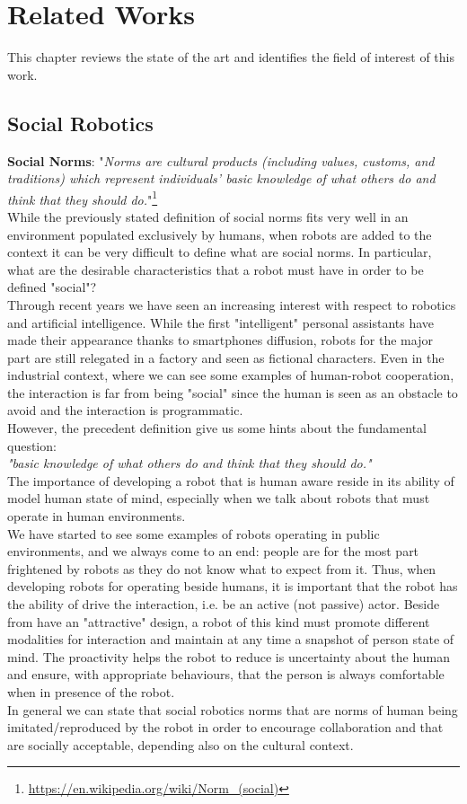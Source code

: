 \documentclass[pdftex,12pt,a4paper]{report}
\begin{document}
\chapter{Related Works}\label{sec:related_works}
This chapter reviews the state of the art and identifies the field of interest of this work.

\section{Social Robotics}
\textbf{Social Norms}: "\textit{Norms are cultural products (including values, customs, and traditions) which represent individuals' basic knowledge of what others do and think that they should do.}"\footnote{\url{https://en.wikipedia.org/wiki/Norm_(social)}}\\
\newline
\noindent While the previously stated definition of social norms fits very well in an environment populated exclusively by humans, when robots are added to the context it can be very difficult to define what are social norms. In particular, what are the desirable characteristics that a robot must have in order to be defined "social"?\\
\noindent Through recent years we have seen an increasing interest with respect to robotics and artificial intelligence. %
While the first "intelligent" personal assistants have made their appearance thanks to smartphones diffusion, robots for the major part are still relegated in a factory and seen as fictional characters.
Even in the industrial context, where we can see some examples of human-robot cooperation, the interaction is far from being "social" since the human is seen as an obstacle to avoid and the interaction is programmatic.\\
However, the precedent definition  give us some hints about the fundamental question:\\ 
\noindent\textit{"basic knowledge of what others do and think that they should do."}\\
The importance of developing a robot that is human aware reside in its ability of model human state of mind, especially when we talk about robots that must operate in human environments.\\
We have started to see some examples of robots operating in public environments, and we always come to an end: people are for the most part frightened by robots as they do not know what to expect from it.
Thus, when developing robots for operating beside humans, it is important that the robot has the ability of  drive the interaction, i.e. be an active (not passive) actor. Beside from have an "attractive" design, a robot of this kind must promote different modalities for interaction and maintain at any time a snapshot of person state of mind. The proactivity helps the robot to reduce is uncertainty about the human and ensure, with appropriate behaviours, that the person is always comfortable when in presence of the robot.\\
In general we can state that social robotics norms that are norms of human being imitated/reproduced by the robot in order to encourage collaboration and that are socially acceptable, depending also on the cultural context.\\ 
\end{document}
